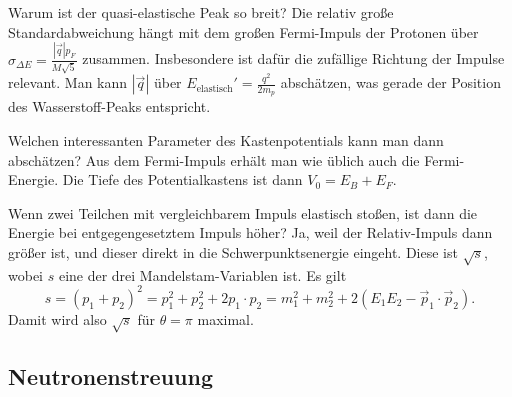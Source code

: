 \begin{fquestion}{Warum ist der quasi-elastische Peak so breit?}
    Die relativ große Standardabweichung hängt mit dem großen Fermi-Impuls der Protonen über $\sigma_{\Delta E} = \frac{|\Vec{q}| p_F}{ M\sqrt{5}}$ zusammen.
    Insbesondere ist dafür die zufällige Richtung der Impulse relevant.
    Man kann $|\Vec{q}|$ über $E_\mathrm{elastisch}' = \frac{q^2}{2m_p}$ abschätzen, was gerade der Position des Wasserstoff-Peaks entspricht.
\end{fquestion}

\begin{fquestion}{Welchen interessanten Parameter des Kastenpotentials kann man dann abschätzen?}
    Aus dem Fermi-Impuls erhält man wie üblich auch die Fermi-Energie.
    Die Tiefe des Potentialkastens ist dann $V_0 = E_B + E_F$.
\end{fquestion}


\begin{fquestion}{Wenn zwei Teilchen mit vergleichbarem Impuls elastisch stoßen, ist dann die Energie bei entgegengesetztem Impuls höher?}
    Ja, weil der Relativ-Impuls dann größer ist, und dieser direkt in die Schwerpunktsenergie eingeht.
    Diese ist $\sqrt{s}$, wobei $s$ eine der drei Mandelstam-Variablen ist.
    Es gilt
    $$s = (p_1 + p_2)^2 = p_1^2 + p_2^2 + 2p_1\cdot p_2 = m_1^2 + m_2^2 + 2(E_1E_2 - \Vec{p}_1\cdot\Vec{p}_2).$$
    Damit wird also $\sqrt{s}$ für $\theta = \pi$ maximal.
\end{fquestion}

\subsection{Neutronenstreuung}


